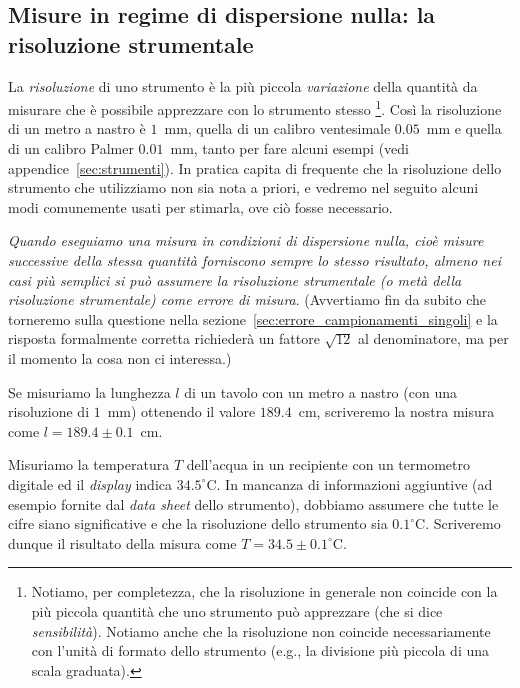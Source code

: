 \subsection{Misure in regime di dispersione nulla: la risoluzione strumentale}

La \emph{risoluzione} di uno strumento è la più piccola \emph{variazione}
della quantità da misurare che è possibile apprezzare con lo strumento
stesso%
\footnote{Notiamo, per completezza, che la risoluzione in generale non coincide
con la più piccola quantità che uno strumento può apprezzare (che
si dice \emph{sensibilità}). Notiamo anche che la risoluzione non coincide
necessariamente con l'unità di formato dello strumento (e.g., la divisione
più piccola di una scala graduata).}.
Così la risoluzione di un metro a nastro è $1$~mm, quella di un calibro
ventesimale $0.05$~mm e quella di un calibro Palmer $0.01$~mm, tanto
per fare alcuni esempi (vedi appendice~\ref{sec:strumenti}). In pratica capita
di frequente che la risoluzione dello strumento che utilizziamo non sia nota
a priori, e vedremo nel seguito alcuni modi comunemente usati per stimarla, ove
ciò fosse necessario.

\emph{Quando eseguiamo una misura in condizioni di dispersione nulla, cioè
  misure successive della stessa quantità forniscono sempre lo stesso
  risultato, almeno nei casi più semplici si può assumere la risoluzione
  strumentale (o metà della risoluzione strumentale) come errore di misura}.
(Avvertiamo fin da subito che torneremo sulla questione nella
sezione~\ref{sec:errore_campionamenti_singoli} e la risposta formalmente
corretta richiederà un fattore $\sqrt{12}$ al denominatore, ma per il momento
la cosa non ci interessa.)

\begin{examplebox}
  \begin{example}\label{exp:metro_a_nastro}
    Se misuriamo la lunghezza $l$ di un tavolo con un metro a nastro (con una
    risoluzione di $1$~mm) ottenendo il valore $189.4$~cm, scriveremo la nostra
    misura come $l = 189.4 \pm 0.1$~cm.
  \end{example}

  \begin{example}\label{exp:termometro_digitale}
    Misuriamo la temperatura $T$ dell'acqua in un recipiente con un termometro
    digitale ed il \emph{display} indica $34.5^\circ$C. In mancanza di
    informazioni aggiuntive (ad esempio fornite dal \emph{data sheet} dello
    strumento), dobbiamo assumere che tutte le cifre siano significative e che
    la risoluzione dello strumento sia $0.1^\circ$C. Scriveremo dunque il
    risultato della misura come $T = 34.5 \pm 0.1^\circ$C.
  \end{example}
\end{examplebox}

